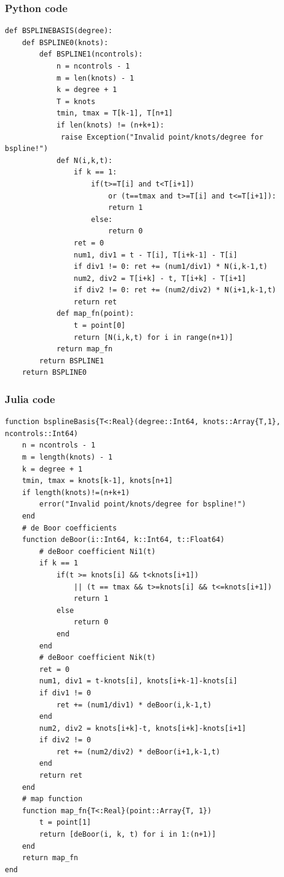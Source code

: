 \documentclass[a4paper,11pt]{article}
\begin{document}
\subsubsection{Python code}

\begin{verbatim}
def BSPLINEBASIS(degree):
    def BSPLINE0(knots):
        def BSPLINE1(ncontrols):
            n = ncontrols - 1
            m = len(knots) - 1
            k = degree + 1
            T = knots
            tmin, tmax = T[k-1], T[n+1]
            if len(knots) != (n+k+1):
	         raise Exception("Invalid point/knots/degree for bspline!")
            def N(i,k,t):
                if k == 1:
                    if(t>=T[i] and t<T[i+1]) 
                        or (t==tmax and t>=T[i] and t<=T[i+1]):
                        return 1
                    else:
                        return 0
                ret = 0
                num1, div1 = t - T[i], T[i+k-1] - T[i]
                if div1 != 0: ret += (num1/div1) * N(i,k-1,t)
                num2, div2 = T[i+k] - t, T[i+k] - T[i+1]
                if div2 != 0: ret += (num2/div2) * N(i+1,k-1,t)
                return ret
            def map_fn(point):
                t = point[0]
                return [N(i,k,t) for i in range(n+1)]
            return map_fn
        return BSPLINE1
    return BSPLINE0
\end{verbatim}

\subsubsection{Julia code}

\begin{verbatim}
function bsplineBasis{T<:Real}(degree::Int64, knots::Array{T,1}, ncontrols::Int64)
    n = ncontrols - 1
    m = length(knots) - 1
    k = degree + 1
    tmin, tmax = knots[k-1], knots[n+1]       
    if length(knots)!=(n+k+1) 
        error("Invalid point/knots/degree for bspline!") 
    end
    # de Boor coefficients
    function deBoor(i::Int64, k::Int64, t::Float64)           
        # deBoor coefficient Ni1(t)
        if k == 1
            if(t >= knots[i] && t<knots[i+1]) 
                || (t == tmax && t>=knots[i] && t<=knots[i+1])
                return 1
            else
                return 0
            end
        end
        # deBoor coefficient Nik(t)
        ret = 0    
        num1, div1 = t-knots[i], knots[i+k-1]-knots[i]
        if div1 != 0 
            ret += (num1/div1) * deBoor(i,k-1,t) 
        end
        num2, div2 = knots[i+k]-t, knots[i+k]-knots[i+1]
        if div2 != 0
            ret += (num2/div2) * deBoor(i+1,k-1,t)
        end
        return ret
    end
    # map function
    function map_fn{T<:Real}(point::Array{T, 1})
        t = point[1]
        return [deBoor(i, k, t) for i in 1:(n+1)]
    end
    return map_fn
end
\end{verbatim}
\end{document}
